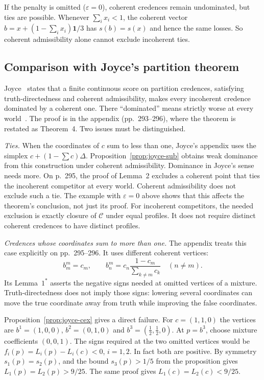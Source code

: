 \documentclass[11pt]{article}
\theoremstyle{definition}
\theoremstyle{remark}
\newcommand{\C}{\mathcal C}
\newcommand{\one}{\mathbf 1}
\begin{document}
If the penalty is omitted ($\varepsilon=0$), coherent credences remain undominated, but ties are possible. Whenever $\sum_i x_i<1$, the coherent vector $b=x+(1-\sum_i x_i)\one/3$ has $s(b)=s(x)$ and hence the same losses. So coherent admissibility alone cannot exclude incoherent ties.

\subsection{Comparison with Joyce's partition theorem}\label{sec:lit}
Joyce~\cite[Theorem 2, pp.~287--288]{Joyce} states that a finite continuous score on partition credences, satisfying truth-directedness and coherent admissibility, makes every incoherent credence dominated by a coherent one. There ``dominated'' means strictly worse at every world~\cite[p.~267]{Joyce}. The proof is in the appendix (pp.~293--296), where the theorem is restated as Theorem~4. Two issues must be distinguished.

\emph{Ties.} When the coordinates of $c$ sum to less than one, Joyce's appendix uses the simplex $c+(1-\sum c)\Delta$. Proposition~\ref{prop:joyce-sub} obtains weak dominance from this construction under coherent admissibility. Dominance in Joyce's sense needs more. On p.~295, the proof of Lemma~2 excludes a coherent point that ties the incoherent competitor at every world. Coherent admissibility does not exclude such a tie. The example with $\varepsilon=0$ above shows that this affects the theorem's conclusion, not just its proof. For incoherent competitors, the needed exclusion is exactly closure of $\C$ under equal profiles. It does not require distinct coherent credences to have distinct profiles.

\emph{Credences whose coordinates sum to more than one.} The appendix treats this case explicitly on pp.~295--296. It uses different coherent vertices:
\[
 b^m_m=c_m,\qquad
 b^m_n=c_n\frac{1-c_m}{\sum_{k\ne m}c_k}\quad(n\ne m).
\]
Its Lemma~$1^*$ asserts the negative signs needed at omitted vertices of a mixture. Truth-directedness does not imply those signs: lowering several coordinates can move the true coordinate away from truth while improving the false coordinates.

Proposition~\ref{prop:joyce-cex} gives a direct failure. For $c=(1,1,0)$ the vertices are $b^1=(1,0,0)$, $b^2=(0,1,0)$ and $b^3=(\tfrac12,\tfrac12,0)$. At $p=b^3$, choose mixture coefficients $(0,0,1)$. The signs required at the two omitted vertices would be $f_i(p)=L_i(p)-L_i(c)<0$, $i=1,2$. In fact both are positive. By symmetry $s_1(p)=s_2(p)$, and the bound $s_3(p)>1/5$ from the proposition gives $L_1(p)=L_2(p)>9/25$. The same proof gives $L_1(c)=L_2(c)<9/25$.
\end{document}
